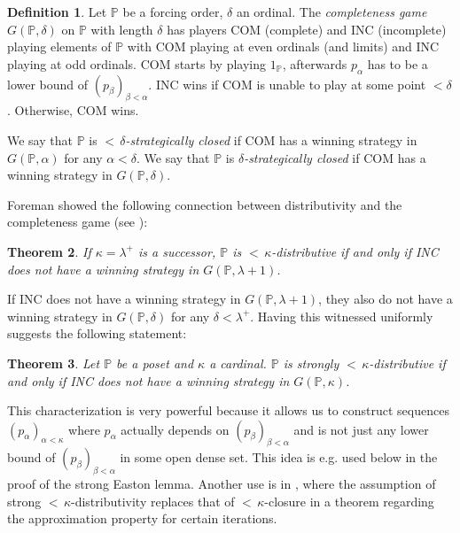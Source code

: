 \documentclass[12pt]{amsart}
\theoremstyle{definition}
\newtheorem{mydef}{Definition}[section]
\theoremstyle{remark}
\theoremstyle{plain}
\newtheorem{mysen}[mydef]{Theorem}
\numberwithin{mydef}{section}
\newcommand{\dP}{\mathbb{P}}
\begin{document}
	\begin{mydef}
		Let $\dP$ be a forcing order, $\delta$ an ordinal. The \emph{completeness game} $G(\dP,\delta)$ on $\dP$ with length $\delta$ has players COM (complete) and INC (incomplete) playing elements of $\dP$ with COM playing at even ordinals (and limits) and INC playing at odd ordinals. COM starts by playing $1_{\dP}$, afterwards $p_{\alpha}$ has to be a lower bound of $(p_{\beta})_{\beta<\alpha}$. INC wins if COM is unable to play at some point $<\delta$. Otherwise, COM wins.
		
		We say that $\dP$ is \emph{${<}\,\delta$-strategically closed} if COM has a winning strategy in $G(\dP,\alpha)$ for any $\alpha<\delta$. We say that $\dP$ is \emph{$\delta$-strategically closed} if COM has a winning strategy in $G(\dP,\delta)$.
	\end{mydef}
	
	Foreman showed the following connection between distributivity and the completeness game (see \cite[Page 718]{ForemanBool}):
	
	\begin{mysen}\label{DistCompleteness}
		If $\kappa=\lambda^+$ is a successor, $\dP$ is ${<}\,\kappa$-distributive if and only if INC does not have a winning strategy in $G(\dP,\lambda+1)$.
	\end{mysen}
	
	If INC does not have a winning strategy in $G(\dP,\lambda+1)$, they also do not have a winning strategy in $G(\dP,\delta)$ for any $\delta<\lambda^+$. Having this witnessed uniformly suggests the following statement:
	
	\begin{mysen}\label{DistCompletenessStrong}
		Let $\dP$ be a poset and $\kappa$ a cardinal. $\dP$ is strongly ${<}\,\kappa$-distributive if and only if INC does not have a winning strategy in $G(\dP,\kappa)$.
	\end{mysen}
	
	This characterization is very powerful because it allows us to construct sequences $(p_{\alpha})_{\alpha<\kappa}$ where $p_{\alpha}$ actually depends on $(p_{\beta})_{\beta<\alpha}$ and is not just any lower bound of $(p_{\beta})_{\beta<\alpha}$ in some open dense set. This idea is e.g. used below in the proof of the strong Easton lemma. Another use is in \cite{JakobSlenderApprox}, where the assumption of strong ${<}\,\kappa$-distributivity replaces that of ${<}\,\kappa$-closure in a theorem regarding the approximation property for certain iterations.
	
\end{document}
